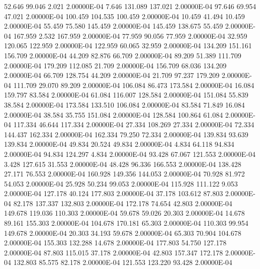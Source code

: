    52.646    99.046     2.021  2.00000E-04
     7.646   131.089   137.021  2.00000E-04
    97.646    69.954    47.021  2.00000E-04
   100.459   104.535   100.459  2.00000E-04
    10.459    41.494    10.459  2.00000E-04
    55.459    75.580   145.459  2.00000E-04
   145.459   138.675    55.459  2.00000E-04
   167.959     2.532   167.959  2.00000E-04
    77.959    90.056    77.959  2.00000E-04
    32.959   120.065   122.959  2.00000E-04
   122.959    60.065    32.959  2.00000E-04
   134.209   151.161   156.709  2.00000E-04
    44.209    82.876    66.709  2.00000E-04
    89.209    51.389   111.709  2.00000E-04
   179.209   112.085    21.709  2.00000E-04
   156.709    68.036   134.209  2.00000E-04
    66.709   128.754    44.209  2.00000E-04
    21.709    97.237   179.209  2.00000E-04
   111.709    29.070    89.209  2.00000E-04
   106.084    86.473   173.584  2.00000E-04
    16.084   159.797    83.584  2.00000E-04
    61.084   116.007   128.584  2.00000E-04
   151.084    55.839    38.584  2.00000E-04
   173.584   133.510   106.084  2.00000E-04
    83.584    71.849    16.084  2.00000E-04
    38.584    35.755   151.084  2.00000E-04
   128.584   100.864    61.084  2.00000E-04
   117.334    46.644   117.334  2.00000E-04
    27.334   108.269    27.334  2.00000E-04
    72.334   144.437   162.334  2.00000E-04
   162.334    79.250    72.334  2.00000E-04
   139.834    93.639   139.834  2.00000E-04
    49.834    20.524    49.834  2.00000E-04
     4.834    64.118    94.834  2.00000E-04
    94.834   124.297     4.834  2.00000E-04
    93.428    67.067   121.553  2.00000E-04
     3.428   127.615    31.553  2.00000E-04
    48.428    96.336   166.553  2.00000E-04
   138.428    27.171    76.553  2.00000E-04
   160.928   149.356   144.053  2.00000E-04
    70.928    81.972    54.053  2.00000E-04
    25.928    50.234    99.053  2.00000E-04
   115.928   111.122     9.053  2.00000E-04
   127.178    40.124   177.803  2.00000E-04
    37.178   103.612    87.803  2.00000E-04
    82.178   137.337   132.803  2.00000E-04
   172.178    74.654    42.803  2.00000E-04
   149.678   119.036   110.303  2.00000E-04
    59.678    59.026    20.303  2.00000E-04
    14.678    89.161   155.303  2.00000E-04
   104.678   170.181    65.303  2.00000E-04
   110.303    99.954   149.678  2.00000E-04
    20.303    34.193    59.678  2.00000E-04
    65.303    70.904   104.678  2.00000E-04
   155.303   132.288    14.678  2.00000E-04
   177.803    54.750   127.178  2.00000E-04
    87.803   115.015    37.178  2.00000E-04
    42.803   157.347   172.178  2.00000E-04
   132.803    85.575    82.178  2.00000E-04
   121.553   123.220    93.428  2.00000E-04
